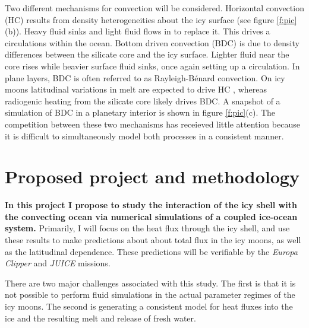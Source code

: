 \documentclass[12pt]{article}
\begin{document}
Two different mechanisms for convection will be considered.
Horizontal convection (HC) results from density heterogeneities about the icy surface (see figure \ref{f:pic}(b)). Heavy fluid sinks and light fluid flows in to replace it. This drives a circulations within the ocean. Bottom driven convection (BDC) is due to density differences between the silicate core and the icy surface. Lighter fluid near the core rises while heavier surface fluid sinks, once again setting up a circulation. In plane layers, BDC is often referred to as Rayleigh-B\'enard convection. On icy moons latitudinal variations in melt are expected to drive HC \citep{wK22}, whereas radiogenic heating from the silicate core \citep{kS14,kS19,jK22} likely drives BDC. A snapshot of a simulation of BDC in a planetary interior is shown in figure \ref{f:pic}(c)\citep{tO25}. The competition between these two mechanisms has receieved little attention because it is difficult to simultaneously model both processes in a consistent manner.


\section{Proposed project and methodology}

\textbf{In this project I propose to study the interaction of the icy shell with the convecting ocean via numerical simulations of a coupled ice-ocean system.} 
Primarily, I will focus on the heat flux through the icy shell, and use these results to make predictions about about total flux in the icy moons, as well as the latitudinal dependence. These predictions will be verifiable by the \textit{Europa Clipper} and \textit{JUICE} missions.

There are two major challenges associated with this study. The first is that it is not possible to perform fluid simulations in the actual parameter regimes of the icy moons. The second is generating a consistent model for heat fluxes into the ice and the resulting melt and release of fresh water.
\end{document}
